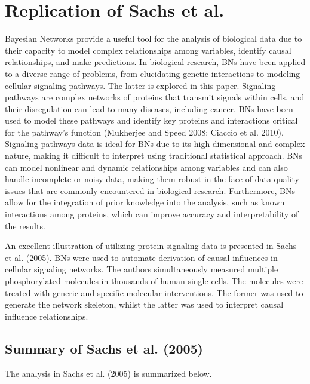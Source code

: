 \documentclass[twocol]{ametsoc}
\begin{document}
\hypertarget{replication-of-sachs-et-al.}{%
\section{Replication of Sachs et
al.}\label{replication-of-sachs-et-al.}}

Bayesian Networks provide a useful tool for the analysis of biological
data due to their capacity to model complex relationships among
variables, identify causal relationships, and make predictions. In
biological research, BNs have been applied to a diverse range of
problems, from elucidating genetic interactions to modeling cellular
signaling pathways. The latter is explored in this paper. Signaling
pathways are complex networks of proteins that transmit signals within
cells, and their disregulation can lead to many diseases, including
cancer. BNs have been used to model these pathways and identify key
proteins and interactions critical for the pathway's function (Mukherjee
and Speed 2008; Ciaccio et al. 2010). Signaling pathways data is ideal
for BNs due to its high-dimensional and complex nature, making it
difficult to interpret using traditional statistical approach. BNs can
model nonlinear and dynamic relationships among variables and can also
handle incomplete or noisy data, making them robust in the face of data
quality issues that are commonly encountered in biological research.
Furthermore, BNs allow for the integration of prior knowledge into the
analysis, such as known interactions among proteins, which can improve
accuracy and interpretability of the results.

An excellent illustration of utilizing protein-signaling data is
presented in Sachs et al. (2005). BNs were used to automate derivation
of causal influences in cellular signaling networks. The authors
simultaneously measured multiple phosphorylated molecules in thousands
of human single cells. The molecules were treated with generic and
specific molecular interventions. The former was used to generate the
network skeleton, whilst the latter was used to interpret causal
influence relationships.

\hypertarget{summary-of-sachs2005}{%
\subsection{Summary of Sachs et al. (2005)}\label{summary-of-sachs2005}}

The analysis in Sachs et al. (2005) is summarized below.
\end{document}
